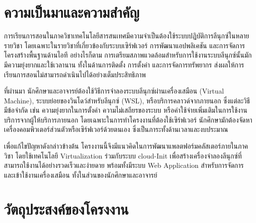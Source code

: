 
\section{ความเป็นมาและความสำคัญ} 

\hspace*{1.5em} %
การเรียนการสอนในภาควิชาเทคโนโลยีสารสนเทศมีความจำเป็นต้องใช้ระบบปฏิบัติการลีนุกซ์ในหลายรายวิชา โดยเฉพาะในรายวิชาที่เกี่ยวข้องกับระบบเซิร์ฟเวอร์ การพัฒนาแอปพลิเคชัน และการจัดการโครงสร้างพื้นฐานด้านไอที อย่างไรก็ตาม การเตรียมสภาพแวดล้อมสำหรับการใช้งานระบบลีนุกซ์นั้นมักมีความยุ่งยากและใช้เวลานาน ทั้งในด้านการติดตั้ง การตั้งค่า และการจัดการทรัพยากร ส่งผลให้การเรียนการสอนไม่สามารถดำเนินไปได้อย่างเต็มประสิทธิภาพ

\hspace*{1.5em}
ที่ผ่านมา นักศึกษาและอาจารย์ต้องใช้วิธีการจำลองระบบลีนุกซ์ผ่านเครื่องเสมือน (Virtual Machine), ระบบย่อยของวินโดว์สำหรับลีนุกซ์ (WSL), หรือบริการคลาวด์จากภายนอก ซึ่งแต่ละวิธีมีข้อจำกัด เช่น ความยุ่งยากในการตั้งค่า ความไม่เสถียรของระบบ หรือค่าใช้จ่ายเพิ่มเติมในการใช้งานบริการจากผู้ให้บริการภายนอก โดยเฉพาะในการทำโครงงานที่ต้องใช้เซิร์ฟเวอร์ นักศึกษามักต้องจัดหาเครื่องคอมพิวเตอร์ส่วนตัวหรือเซิร์ฟเวอร์ด้วยตนเอง ซึ่งเป็นภาระทั้งด้านเวลาและงบประมาณ

\hspace*{1.5em}
เพื่อแก้ไขปัญหาดังกล่าวข้างต้น โครงงานนี้จึงมีแนวคิดในการพัฒนาแพลตฟอร์มคลัสเตอร์ภายในภาควิชา โดยใช้เทคโนโลยี Virtualization ร่วมกับระบบ cloud-Init เพื่อสร้างเครื่องจำลองลีนุกซ์ที่สามารถใช้งานได้อย่างรวดเร็วและง่ายดาย พร้อมทั้งมีระบบ Web Application สำหรับการจัดการและเข้าใช้งานเครื่องเสมือน ทั้งในส่วนของนักศึกษาและอาจารย์



\section{วัตถุประสงค์ของโครงงาน}

